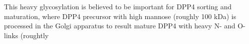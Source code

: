 This heavy glycosylation is believed to be important for DPP4 sorting and maturation, where DPP4 precursor with high mannose (roughly 100 kDa) is processed in the Golgi apparatus to result mature DPP4 with heavy N- and O-links (roughtly \cite{Matter_1991}